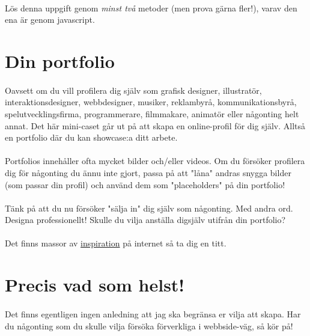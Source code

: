 \documentclass{article}
\begin{document}
    \paragraph{}
      Lös denna uppgift genom \emph{minst två} metoder (men prova gärna fler!), varav den ena är genom javascript.




  \newpage
  \section{ Din portfolio }
    \paragraph{}
    Oavsett om du vill profilera dig själv som grafisk designer, illustratör, interaktionsdesigner, webbdesigner, musiker, reklambyrå, kommunikationsbyrå, spelutvecklingsfirma, programmerare, filmmakare, animatör eller någonting helt annat. Det här mini-caset går ut på att skapa en online-profil för dig själv. Alltså en portfolio där du kan showcase:a ditt arbete.

    \paragraph{}
    Portfolios innehåller ofta mycket bilder och/eller videos. Om du försöker profilera dig för någonting du ännu inte gjort, passa på att "låna" andras snygga bilder (som passar din profil) och använd dem som "placeholders" på din portfolio!

    \paragraph{}
    Tänk på att du nu försöker "sälja in" dig själv som någonting. Med andra ord. Designa professionellt! Skulle du vilja anställa digsjälv utifrån din portfolio?

    \paragraph{}
    Det finns massor av \href{http://www.portfoliobox.net/examples}{inspiration} på internet så ta dig en titt.




  \newpage
  \section{ Precis vad som helst! }
    \paragraph{}
    Det finns egentligen ingen anledning att jag ska begränsa er vilja att skapa. Har du någonting som du skulle vilja försöka förverkliga i webbside-väg, så kör på!
\end{document}
